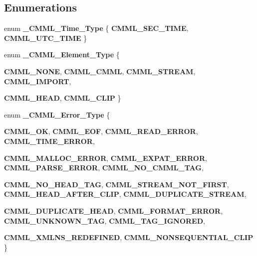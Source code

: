 \subsection*{Enumerations}
\begin{CompactItemize}
\item 
enum {\bf \_\-CMML\_\-Time\_\-Type} \{ {\bf CMML\_\-SEC\_\-TIME}, 
{\bf CMML\_\-UTC\_\-TIME}
 \}
\item 
enum {\bf \_\-CMML\_\-Element\_\-Type} \{ \par
{\bf CMML\_\-NONE}, 
{\bf CMML\_\-CMML}, 
{\bf CMML\_\-STREAM}, 
{\bf CMML\_\-IMPORT}, 
\par
{\bf CMML\_\-HEAD}, 
{\bf CMML\_\-CLIP}
 \}
\item 
enum {\bf \_\-CMML\_\-Error\_\-Type} \{ \par
{\bf CMML\_\-OK}, 
{\bf CMML\_\-EOF}, 
{\bf CMML\_\-READ\_\-ERROR}, 
{\bf CMML\_\-TIME\_\-ERROR}, 
\par
{\bf CMML\_\-MALLOC\_\-ERROR}, 
{\bf CMML\_\-EXPAT\_\-ERROR}, 
{\bf CMML\_\-PARSE\_\-ERROR}, 
{\bf CMML\_\-NO\_\-CMML\_\-TAG}, 
\par
{\bf CMML\_\-NO\_\-HEAD\_\-TAG}, 
{\bf CMML\_\-STREAM\_\-NOT\_\-FIRST}, 
{\bf CMML\_\-HEAD\_\-AFTER\_\-CLIP}, 
{\bf CMML\_\-DUPLICATE\_\-STREAM}, 
\par
{\bf CMML\_\-DUPLICATE\_\-HEAD}, 
{\bf CMML\_\-FORMAT\_\-ERROR}, 
{\bf CMML\_\-UNKNOWN\_\-TAG}, 
{\bf CMML\_\-TAG\_\-IGNORED}, 
\par
{\bf CMML\_\-XMLNS\_\-REDEFINED}, 
{\bf CMML\_\-NONSEQUENTIAL\_\-CLIP}
 \}
\end{CompactItemize}
